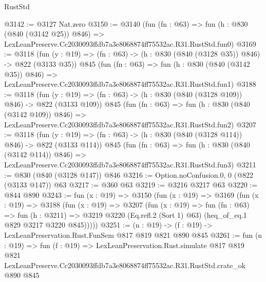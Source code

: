 \begin{lexlean}{RustStd}
\begin{coremodule}
@3142 := @3127 Nat.zero
@3150 := @3140
    (fun (fn : @63) =>
    fun (h : @830 (@840 (@3142 @25)) @846) =>
    LexLeanPreserve.Cc2030093ffdb7a3e8068874ff75532ac.R31.RustStd.fun0)
@3169 := @3118
    (fun (y : @19) => (fn : @63) -> (h : @830 (@840 (@3128 @35)) @846) -> @822 (@3133 @35))
    @845
    (fun (fn : @63) =>
    fun (h : @830 (@840 (@3142 @35)) @846) =>
    LexLeanPreserve.Cc2030093ffdb7a3e8068874ff75532ac.R31.RustStd.fun1)
@3188 := @3118
    (fun (y : @19) => (fn : @63) -> (h : @830 (@840 (@3128 @109)) @846) -> @822 (@3133 @109))
    @845
    (fun (fn : @63) =>
    fun (h : @830 (@840 (@3142 @109)) @846) =>
    LexLeanPreserve.Cc2030093ffdb7a3e8068874ff75532ac.R31.RustStd.fun2)
@3207 := @3118
    (fun (y : @19) => (fn : @63) -> (h : @830 (@840 (@3128 @114)) @846) -> @822 (@3133 @114))
    @845
    (fun (fn : @63) =>
    fun (h : @830 (@840 (@3142 @114)) @846) =>
    LexLeanPreserve.Cc2030093ffdb7a3e8068874ff75532ac.R31.RustStd.fun3)
@3211 := @830 (@840 (@3128 @147)) @846
@3216 := Option.noConfusion.{0, 0} (@822 (@3133 @147)) @63
@3217 := @360 @63
@3219 := @3216 @3217 @63
@3220 := @844 @890
@3243 := fun (x : @19) =>
  @3150
    (fun (x : @19) =>
    @3169
      (fun (x : @19) =>
      @3188
        (fun (x : @19) =>
        @3207
          (fun (x : @19) =>
          fun (fn : @63) =>
          fun (h : @3211) =>
          @3219 @3220 (Eq.refl.{2} (Sort 1) @63) (heq_of_eq.{1} @829 @3217 @3220 @845)))))
@3251 := (n : @19) -> (f : @19) -> LexLeanPreservation.Rust.FunSem @817 @819 @821 @890 @845
@3261 := fun (n : @19) =>
  fun (f : @19) =>
  LexLeanPreservation.Rust.simulate
    @817
    @819
    @821
    LexLeanPreserve.Cc2030093ffdb7a3e8068874ff75532ac.R31.RustStd.crate_ok
    @890
    @845
\end{coremodule}
\end{lexlean}
